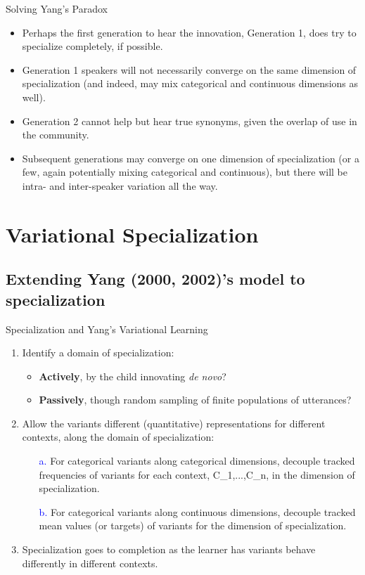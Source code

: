 \documentclass[hyperref={pdfpagelabels=false}]{beamer}
\begin{document}
\begin{frame}{Solving Yang's Paradox}
		\begin{itemize}
			\item Perhaps the first generation to hear the innovation, Generation 1, does try to specialize completely, if possible.
			\item Generation 1 speakers will not necessarily converge on the same dimension of specialization (and indeed, may mix categorical and continuous dimensions as well).
			\item Generation 2 cannot help but hear true synonyms, given the overlap of use in the community.
			\item Subsequent generations may converge on one dimension of specialization (or a few, again potentially mixing categorical and continuous), but there will be intra- and inter-speaker variation all the way.
		\end{itemize}
\end{frame}


\section{Variational Specialization}
\subsection{Extending Yang (2000, 2002)'s model to specialization}
\begin{frame}{Specialization and Yang's Variational Learning}
		\begin{enumerate}
			\item Identify a domain of specialization:
				\begin{itemize}
					\item \textbf{Actively}, by the child innovating \textsl{de novo}?
					\item \textbf{Passively}, though random sampling of finite populations of utterances?
				\end{itemize}
			\item Allow the variants different (quantitative) representations for different contexts, along the domain of specialization:
			\begin{itemize}
				\item[\textcolor{blue}{a.}] For categorical variants along categorical dimensions, decouple tracked frequencies of variants for each context, C_1,...,C_n, in the dimension of specialization.
				\item[\textcolor{blue}{b.}] For categorical variants along continuous dimensions, decouple tracked mean values (or targets) of variants for the dimension of specialization.
			\end{itemize}
			\item Specialization goes to completion as the learner has variants behave differently in different contexts.		\end{enumerate}
\end{frame}
\end{document}
